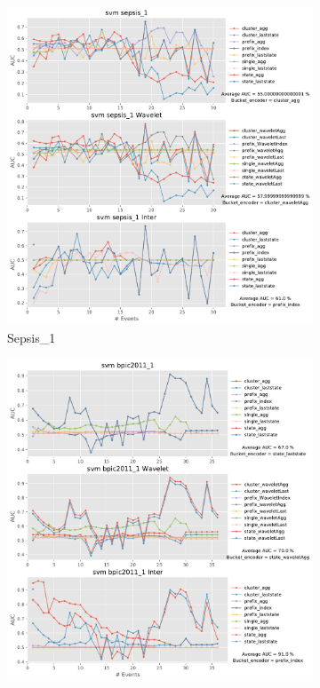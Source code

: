 \documentclass[twoside,11pt]{Latex/Classes/PhDthesisPSnPDF}
\begin{document}
\begin{figure}[!htbp] %
	
	\begin{subfigure}{0.48\textwidth}
		\includegraphics[width=\linewidth]{images/inter/svm/sepsis_1.pdf}
		\caption{Sepsis\_1} \label{fig:sepsisi}
	\end{subfigure}\hspace*{\fill}
	\begin{subfigure}{0.48\textwidth}
		\includegraphics[width=\linewidth]{images/inter/svm/bpic2011_1.pdf}

\end{subfigure}
\end{figure}
\end{document}
